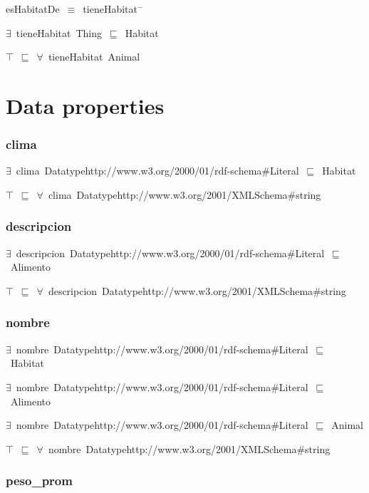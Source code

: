 esHabitatDe~\ensuremath{\equiv}~tieneHabitat\ensuremath{^-}

\ensuremath{\exists}~tieneHabitat~Thing~\ensuremath{\sqsubseteq}~Habitat

\ensuremath{\top}~\ensuremath{\sqsubseteq}~\ensuremath{\forall}~tieneHabitat~Animal

\section*{Data properties}\subsubsection*{clima}

\ensuremath{\exists}~clima~Datatypehttp://www.w3.org/2000/01/rdf-schema\#Literal~\ensuremath{\sqsubseteq}~Habitat

\ensuremath{\top}~\ensuremath{\sqsubseteq}~\ensuremath{\forall}~clima~Datatypehttp://www.w3.org/2001/XMLSchema\#string

\subsubsection*{descripcion}

\ensuremath{\exists}~descripcion~Datatypehttp://www.w3.org/2000/01/rdf-schema\#Literal~\ensuremath{\sqsubseteq}~Alimento

\ensuremath{\top}~\ensuremath{\sqsubseteq}~\ensuremath{\forall}~descripcion~Datatypehttp://www.w3.org/2001/XMLSchema\#string

\subsubsection*{nombre}

\ensuremath{\exists}~nombre~Datatypehttp://www.w3.org/2000/01/rdf-schema\#Literal~\ensuremath{\sqsubseteq}~Habitat

\ensuremath{\exists}~nombre~Datatypehttp://www.w3.org/2000/01/rdf-schema\#Literal~\ensuremath{\sqsubseteq}~Alimento

\ensuremath{\exists}~nombre~Datatypehttp://www.w3.org/2000/01/rdf-schema\#Literal~\ensuremath{\sqsubseteq}~Animal

\ensuremath{\top}~\ensuremath{\sqsubseteq}~\ensuremath{\forall}~nombre~Datatypehttp://www.w3.org/2001/XMLSchema\#string

\subsubsection*{peso\_prom}


